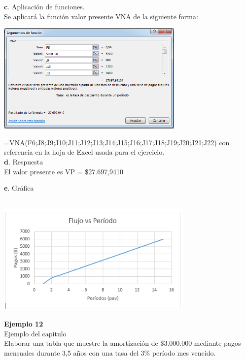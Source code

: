 \vspace{2mm}
\vspace{2mm}

\textbf{c}. Aplicación de funciones.
 \\
 
Se aplicará la función  valor presente VNA de la siguiente forma:     
 
 \begin{center}
	\includegraphics[height=5.4cm]{img/ch8/8_23.png}
\end{center}
=VNA(F6;J8;J9;J10;J11;J12;J13;J14;J15;J16;J17;J18;J19;J20;J21;J22) con referencia en la hoja de Excel usada para el ejercicio.
\\ 
 
\textbf{d}. Respuesta\\

El valor presente es VP = \$27.697,9410

\vspace{2mm}

\textbf{e}. Gráfica\\
\ \begin{center}
	\includegraphics[height=5.4cm]{img/ch8/8_24.png}
\end{center}

\textbf{Ejemplo 12}\\

Ejemplo del capitulo
\\

Elaborar una tabla que muestre la amortización de \$3.000.000 mediante pagos mensuales durante 3,5 años con una tasa del 3\% período mes vencido.

